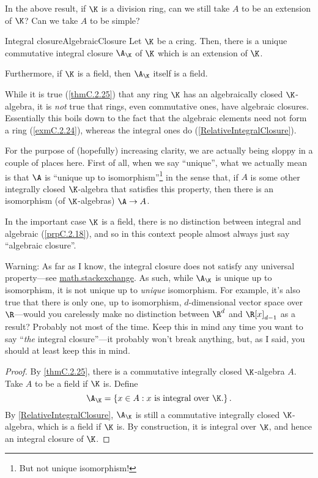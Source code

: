 \begin{exr}{}{}
	In the above result, if $\K$ is a division ring, can we still take $A$ to be an extension of $\K$?  Can we take $A$ to be simple?
\end{exr}
\begin{thm}{Integral closure}{AlgebraicClosure}
	Let $\K$ be a cring.  Then, there is a unique commutative integral closure $\A _{\K}$\index[notation]{$\A _{\K}$} of $\K$ which is an extension of $\K$.
	
	Furthermore, if $\K$ is a field, then $\A _{\K}$ itself is a field.
	\begin{rmk}
		While it is true (\cref{thmC.2.25}) that any ring $\K$ has an algebraically closed $\K$-algebra, it is \emph{not} true that rings, even commutative ones, have algebraic closures.  Essentially this boils down to the fact that the algebraic elements need not form a ring (\cref{exmC.2.24}), whereas the integral ones do (\cref{RelativeIntegralClosure}).
	\end{rmk}
	\begin{rmk}
		For the purpose of (hopefully) increasing clarity, we are actually being sloppy in a couple of places here.  First of all, when we say ``unique'', what we actually mean is that $\A$ is ``unique up to isomorphism''\footnote{But not unique isomorphism!} in the sense that, if $A$ is some other integrally closed $\K$-algebra that satisfies this property, then there is an isomorphism (of $\K$-algebras) $\A \rightarrow A$.
	\end{rmk}
	\begin{rmk}
		In the important case $\K$ is a field, there is no distinction between integral and algebraic (\cref{prpC.2.18}), and so in this context people almost always just say ``algebraic closure''.
	\end{rmk}
	\begin{rmk}
		Warning:  As far as I know, the integral closure does not satisfy any universal property---see \href{https://math.stackexchange.com/questions/1033209/universal-property-of-the-algebraic closure-of-a-field}{math.stackexchange}.  As such, while $\A _{\K}$ is unique up to isomorphism, it is not unique up to \emph{unique} isomorphism.  For example, it's also true that there is only one, up to isomorphism, $d$-dimensional vector space over $\R$---would you carelessly make no distinction between $\R ^d$ and $\R [x]_{d-1}$ as a result?  Probably not most of the time.  Keep this in mind any time you want to say ``\emph{the} integral closure''---it probably won't break anything, but, as I said, you should at least keep this in mind.
	\end{rmk}
	\begin{proof}
		By \cref{thmC.2.25}, there is a commutative integrally closed $\K$-algebra $A$.  Take $A$ to be a field if $\K$ is.  Define
		\begin{equation}
			\A _{\K}=\left\{ x\in A:x\text{ is integral over }\K \text{.}\right\} .
		\end{equation}
		By \cref{RelativeIntegralClosure}, $\A _{\K}$ is still a commutative integrally closed $\K$-algebra, which is a field if $\K$ is.  By construction, it is integral over $\K$, and hence an integral closure of $\K$.
		

\end{proof}
\end{thm}
